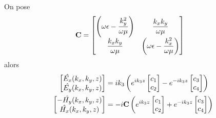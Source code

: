     \begin{prop}
        On pose 
        \begin{align}
            \mathbf{C} &=
            \begin{bmatrix}
                \left(\omega\epsilon-\dfrac{k_y^2}{\omega\mu}\right) & \dfrac{k_xk_y}{\omega\mu}\\
                \dfrac{k_xk_y}{\omega\mu} & \left(\omega\epsilon-\dfrac{k_x^2}{\omega\mu}\right)
            \end{bmatrix}
        \end{align}
        alors 
        \begin{subequations}
            \label{eq:imp_fourier:plan:champs}
            \begin{align}
                \begin{bmatrix}
                    \hat{E_x}(k_x,k_y,z)\\
                    \hat{E_y}(k_x,k_y,z)\\
                \end{bmatrix}
                &=ik_3\left( e^{ik_3 z}
                \begin{bmatrix}
                    c_1 \\
                    c_2
                \end{bmatrix}
                -e^{-ik_3 z}
                \begin{bmatrix}
                    c_3 \\
                    c_4
                \end{bmatrix}
                \right)
                \label{eq:imp_fourier:plan:champs:E}
                \\
                \begin{bmatrix}
                    -\hat{H_y}(k_x,k_y,z)\\
                    \hat{H_x}(k_x,k_y,z)\\
                \end{bmatrix}
                &=-i
                \mathbf{C}
                \left(
                    e^{ik_3 z}
                    \begin{bmatrix}
                        c_1 \\
                        c_2
                    \end{bmatrix}
                    +e^{-ik_3 z}
                    \begin{bmatrix}
                        c_3 \\
                        c_4
                    \end{bmatrix}
                \right)
                \label{eq:imp_fourier:plan:champs:H}
            \end{align}
        \end{subequations}
    \end{prop}

